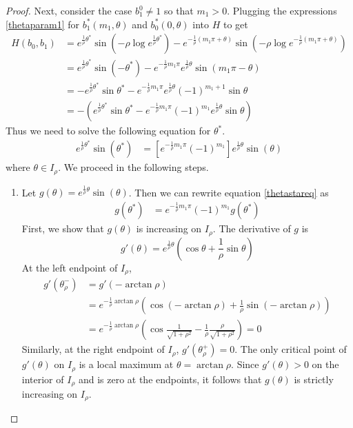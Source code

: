 \documentclass[thesis.tex]{subfiles}
\begin{document}
\begin{lemma}
\begin{proof}
Next, consider the case $b_1^0 \neq 1$ so that $m_1 > 0$. Plugging the expressions \eqref{thetaparam1} for $b_1^*(m_1, \theta)$ and $b_0^*(0, \theta)$ into $H$ to get
\begin{align*}
H(b_0, b_1) &= e^{ \frac{1}{\rho}\theta^* } \sin\left( -\rho \log e^{ \frac{1}{\rho}\theta^* }\right) - e^{ -\frac{1}{\rho}(m_1 \pi + \theta) }\sin \left( -\rho \log e^{ -\frac{1}{\rho}(m_1 \pi + \theta) } \right) \\
&= e^{ \frac{1}{\rho}\theta^* } \sin\left( -\theta^* \right) - e^{ -\frac{1}{\rho} m_1 \pi} e^{ \frac{1}{\rho} \theta } \sin(m_1 \pi - \theta) \\
&= -e^{ \frac{1}{\rho}\theta^* } \sin \theta^*  - e^{ -\frac{1}{\rho} m_1 \pi } e^{ \frac{1}{\rho} \theta } (-1)^{m_1 + 1} \sin\theta \\
&= -\left( e^{ \frac{1}{\rho}\theta^* } \sin \theta^* - e^{ -\frac{1}{\rho} m_1 \pi } (-1)^{m_1} e^{ \frac{1}{\rho} \theta } \sin \theta \right)
\end{align*}
Thus we need to solve the following equation for $\theta^*$.
\begin{align}\label{thetastareq}
e^{ \frac{1}{\rho}\theta^* } \sin\left( \theta^* \right) &= \left[ e^{ -\frac{1}{\rho} m_1 \pi } (-1)^{m_1} \right] e^{ \frac{1}{\rho} \theta } \sin(\theta)
\end{align}
where $\theta \in I_\rho$. We proceed in the following steps.
\begin{enumerate}
	\item Let $g(\theta) = e^{ \frac{1}{\rho} \theta } \sin(\theta)$. Then we can rewrite equation \eqref{thetastareq} as
	\begin{align}\label{thetastareq2}
	g(\theta^*) &= e^{ -\frac{1}{\rho} m_1 \pi } (-1)^{m_1} g(\theta^*)
	\end{align}
	First, we show that $g(\theta)$ is increasing on $I_\rho$. The derivative of $g$ is 
	\begin{equation}\label{gprime}
	g'(\theta) = e^{ \frac{1}{\rho} \theta } \left( \cos \theta + \frac{1}{\rho} \sin \theta \right)
	\end{equation}
	At the left endpoint of $I_\rho$,
	\begin{align*}
	g'(\theta_\rho^-) &= g'(-\arctan \rho) \\
	 &= e^{ -\frac{1}{\rho} \arctan \rho } \left(\cos(-\arctan \rho) + \frac{1}{\rho} \sin(-\arctan \rho)\right) \\
	&= e^{ -\frac{1}{\rho} \arctan \rho } \left(\cos\frac{1}{\sqrt{1 + \rho^2}} - \frac{1}{\rho} \frac{\rho}{\sqrt{1 + \rho^2}}\right) = 0
	\end{align*}
	Similarly, at the right endpoint of $I_\rho$, $g'(\theta_\rho^+) = 0$.
	The only critical point of $g'(\theta)$ on $I_\rho$ is a local maximum at $\theta = \arctan \rho$. Since $g'(\theta) > 0$ on the interior of $I_\rho$ and is zero at the endpoints, it follows that $g(\theta)$ is strictly increasing on $I_\rho$.
	

\end{enumerate}
\end{proof}
\end{lemma}
\end{document}
